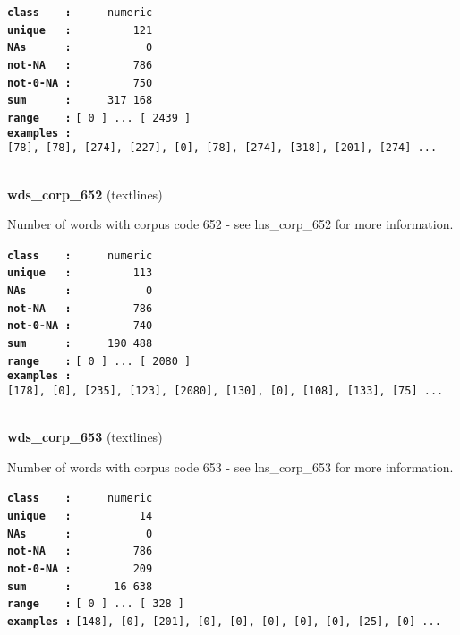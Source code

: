 \documentclass[]{article}
\begin{document}
\textbf{\texttt{class\ \ \ \ :}} \texttt{~~~~~numeric}\\
\textbf{\texttt{unique\ \ \ :}} \texttt{~~~~~~~~~121}\\
\textbf{\texttt{NAs\ \ \ \ \ \ :}} \texttt{~~~~~~~~~~~0}\\
\textbf{\texttt{not-NA\ \ \ :}} \texttt{~~~~~~~~~786}\\
\textbf{\texttt{not-0-NA\ :}} \texttt{~~~~~~~~~750}\\
\textbf{\texttt{sum\ \ \ \ \ \ :}} \texttt{~~~~~317~168}\\
\textbf{\texttt{range\ \ \ \ :}}
\texttt{{[}\ 0\ {]}\ ...\ {[}\ 2439\ {]}}\\
\textbf{\texttt{examples\ :}}
\texttt{{[}78{]},\ {[}78{]},\ {[}274{]},\ {[}227{]},\ {[}0{]},\ {[}78{]},\ {[}274{]},\ {[}318{]},\ {[}201{]},\ {[}274{]}\ ...}\\

~

\textbf{wds\_corp\_652} (textlines)

Number of words with corpus code 652 - see lns\_corp\_652 for more
information.

\textbf{\texttt{class\ \ \ \ :}} \texttt{~~~~~numeric}\\
\textbf{\texttt{unique\ \ \ :}} \texttt{~~~~~~~~~113}\\
\textbf{\texttt{NAs\ \ \ \ \ \ :}} \texttt{~~~~~~~~~~~0}\\
\textbf{\texttt{not-NA\ \ \ :}} \texttt{~~~~~~~~~786}\\
\textbf{\texttt{not-0-NA\ :}} \texttt{~~~~~~~~~740}\\
\textbf{\texttt{sum\ \ \ \ \ \ :}} \texttt{~~~~~190~488}\\
\textbf{\texttt{range\ \ \ \ :}}
\texttt{{[}\ 0\ {]}\ ...\ {[}\ 2080\ {]}}\\
\textbf{\texttt{examples\ :}}
\texttt{{[}178{]},\ {[}0{]},\ {[}235{]},\ {[}123{]},\ {[}2080{]},\ {[}130{]},\ {[}0{]},\ {[}108{]},\ {[}133{]},\ {[}75{]}\ ...}\\

~

\textbf{wds\_corp\_653} (textlines)

Number of words with corpus code 653 - see lns\_corp\_653 for more
information.

\textbf{\texttt{class\ \ \ \ :}} \texttt{~~~~~numeric}\\
\textbf{\texttt{unique\ \ \ :}} \texttt{~~~~~~~~~~14}\\
\textbf{\texttt{NAs\ \ \ \ \ \ :}} \texttt{~~~~~~~~~~~0}\\
\textbf{\texttt{not-NA\ \ \ :}} \texttt{~~~~~~~~~786}\\
\textbf{\texttt{not-0-NA\ :}} \texttt{~~~~~~~~~209}\\
\textbf{\texttt{sum\ \ \ \ \ \ :}} \texttt{~~~~~~16~638}\\
\textbf{\texttt{range\ \ \ \ :}}
\texttt{{[}\ 0\ {]}\ ...\ {[}\ 328\ {]}}\\
\textbf{\texttt{examples\ :}}
\texttt{{[}148{]},\ {[}0{]},\ {[}201{]},\ {[}0{]},\ {[}0{]},\ {[}0{]},\ {[}0{]},\ {[}0{]},\ {[}25{]},\ {[}0{]}\ ...}\\
\end{document}
